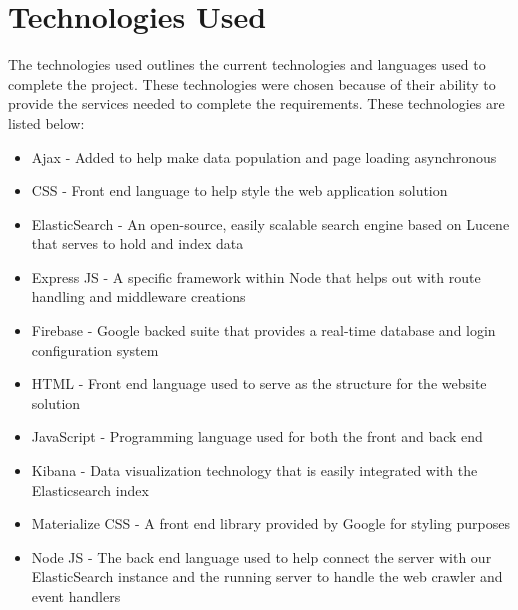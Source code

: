 \chapter{Technologies Used}
The technologies used outlines the current technologies and languages used to complete the project. These technologies were chosen because of their ability to provide the services needed to complete the requirements. These technologies are listed below:
\begin{itemize}
	\item Ajax - Added to help make data population and page loading asynchronous
	\item CSS - Front end language to help style the web application solution
	\item ElasticSearch - An open-source, easily scalable search engine based on Lucene that serves to hold and index data
	\item Express JS  - A specific framework within Node that helps out with route handling and middleware creations
	\item Firebase - Google backed suite that provides a real-time database and login configuration system
	\item HTML - Front end language used to serve as the structure for the website solution
	\item JavaScript - Programming language used for both the front and back end 
	\item Kibana - Data visualization technology that is easily integrated with the Elasticsearch index
    \item Materialize CSS - A front end library provided by Google for styling purposes
	\item Node JS - The back end language used to help connect the server with our ElasticSearch instance and the running server to handle the web crawler and event handlers	
\end{itemize}
